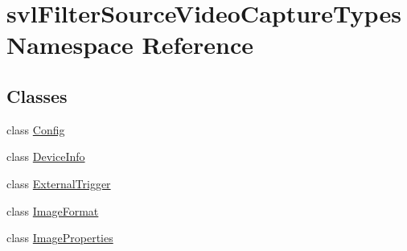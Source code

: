 \hypertarget{namespacesvl_filter_source_video_capture_types}{}\section{svl\+Filter\+Source\+Video\+Capture\+Types Namespace Reference}
\label{namespacesvl_filter_source_video_capture_types}
\subsection*{Classes}
\begin{DoxyCompactItemize}
\item 
class \hyperlink{classsvl_filter_source_video_capture_types_1_1_config}{Config}
\item 
class \hyperlink{classsvl_filter_source_video_capture_types_1_1_device_info}{Device\+Info}
\item 
class \hyperlink{classsvl_filter_source_video_capture_types_1_1_external_trigger}{External\+Trigger}
\item 
class \hyperlink{classsvl_filter_source_video_capture_types_1_1_image_format}{Image\+Format}
\item 
class \hyperlink{classsvl_filter_source_video_capture_types_1_1_image_properties}{Image\+Properties}
\end{DoxyCompactItemize}
